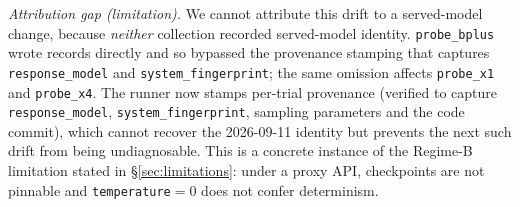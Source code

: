 \documentclass{article}
\begin{document}
\emph{Attribution gap (limitation).} We cannot attribute this drift to a served-model change, because \emph{neither} collection recorded served-model identity. \texttt{probe\_bplus} wrote records directly and so bypassed the provenance stamping that captures \texttt{response\_model} and \texttt{system\_fingerprint}; the same omission affects \texttt{probe\_x1} and \texttt{probe\_x4}. The runner now stamps per-trial provenance (verified to capture \texttt{response\_model}, \texttt{system\_fingerprint}, sampling parameters and the code commit), which cannot recover the 2026-09-11 identity but prevents the next such drift from being undiagnosable. This is a concrete instance of the Regime-B limitation stated in \S\ref{sec:limitations}: under a proxy API, checkpoints are not pinnable and \texttt{temperature}${=}0$ does not confer determinism.
\end{document}
